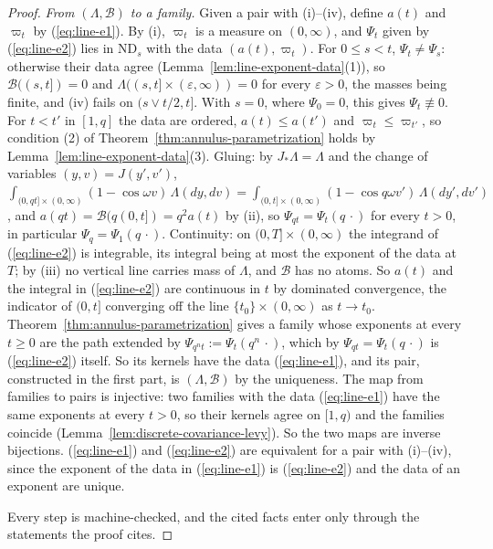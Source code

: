 \begin{proof}
\emph{From $(\Lambda, \mathcal{B})$ to a family.} Given a pair with (i)--(iv), define $a(t)$ and
$\varpi_t$ by (\ref{eq:line-e1}). By (i), $\varpi_t$ is a \Levy{} measure on $(0,\infty)$, and $\Psi_t$ given
by (\ref{eq:line-e2}) lies in $\mathrm{ND}_s$ with the data $(a(t), \varpi_t)$. For $0 \le s < t$,
$\Psi_t \ne \Psi_s$: otherwise their data agree (Lemma~\ref{lem:line-exponent-data}(1)), so
$\mathcal{B}((s,t]) = 0$ and $\Lambda((s,t] \times (\varepsilon,\infty)) = 0$ for every
$\varepsilon > 0$, the masses being finite, and (iv) fails on $(s \vee t/2, t]$. With $s = 0$, where
$\Psi_0 = 0$, this gives $\Psi_t \not\equiv 0$. For $t < t'$ in $[1,q]$ the data are ordered,
$a(t) \le a(t')$ and $\varpi_t \le \varpi_{t'}$, so condition (2) of
Theorem~\ref{thm:annulus-parametrization} holds by Lemma~\ref{lem:line-exponent-data}(3).
Gluing: by $J_*\Lambda = \Lambda$ and the change of variables $(y, v) = J(y', v')$,
$\int_{(0,qt] \times (0,\infty)}(1 - \cos\omega v)\,\Lambda(dy, dv)
= \int_{(0,t] \times (0,\infty)}(1 - \cos q\omega v')\,\Lambda(dy', dv')$, and
$a(qt) = \mathcal{B}(q(0,t]) = q^2a(t)$ by (ii), so $\Psi_{qt} = \Psi_t(q\,\cdot)$ for every
$t > 0$, in particular $\Psi_q = \Psi_1(q\,\cdot)$. Continuity: on $(0,T] \times (0,\infty)$ the
integrand of (\ref{eq:line-e2}) is integrable, its integral being at most the exponent of the data at $T$; by
(iii) no vertical line carries mass of $\Lambda$, and $\mathcal{B}$ has no atoms. So $a(t)$ and the
integral in (\ref{eq:line-e2}) are continuous in $t$ by dominated convergence, the indicator of $(0,t]$
converging off the line $\{t_0\} \times (0,\infty)$ as $t \to t_0$.
Theorem~\ref{thm:annulus-parametrization} gives a family whose exponents at every $t \ge 0$ are the
path extended by $\Psi_{q^nt} := \Psi_t(q^n\,\cdot)$, which by $\Psi_{qt} = \Psi_t(q\,\cdot)$ is
(\ref{eq:line-e2}) itself. So its kernels have the data (\ref{eq:line-e1}), and its pair, constructed in the first part, is
$(\Lambda, \mathcal{B})$ by the uniqueness. The map from families to pairs is injective: two
families with the data (\ref{eq:line-e1}) have the same exponents at every $t > 0$, so their kernels agree on
$[1,q)$ and the families coincide (Lemma~\ref{lem:discrete-covariance-levy}). So the two maps are
inverse bijections. (\ref{eq:line-e1}) and (\ref{eq:line-e2}) are equivalent for a pair with (i)--(iv), since the
exponent of the data in (\ref{eq:line-e1}) is (\ref{eq:line-e2}) and the data of an exponent are unique.

Every step is machine-checked, and the cited facts enter only through the statements the proof
cites.
\end{proof}

